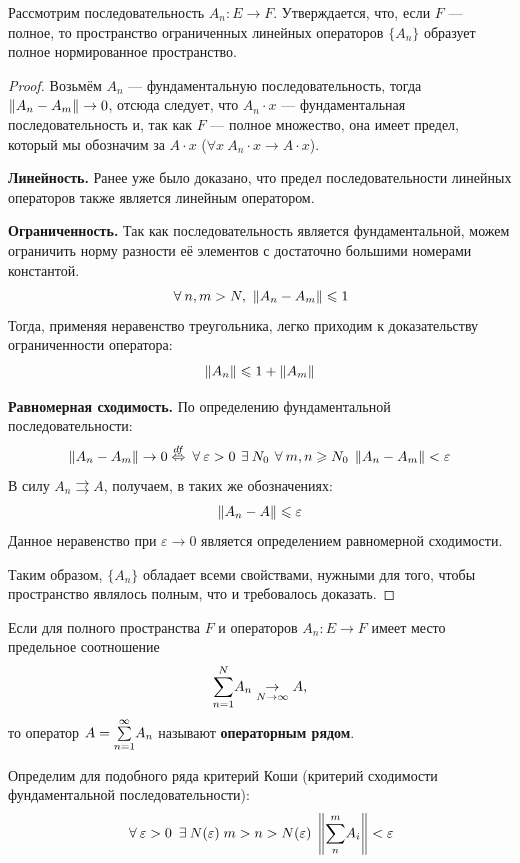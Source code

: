 \documentclass[12pt]{article}
\begin{document}
		\begin{state}
			Рассмотрим последовательность $A_n : E \rightarrow F$. Утверждается, что, если $F$ --- полное, то пространство 
			ограниченных линейных операторов $\{A_n\}$ образует полное нормированное пространство.
		\end{state}
		\begin{proof}
			Возьмём $A_n$ --- фундаментальную последовательность, тогда $\left\| A_n - A_m \right\| \rightarrow 0$, отсюда следует, что 
			$A_n \cdot x$ --- фундаментальная последовательность и, так как $F$ --- полное множество, она имеет предел, который
			мы обозначим за $A \cdot x$ ($\forall x \: A_n \cdot x \rightarrow A \cdot x$).
		
			\textbf{Линейность.} Ранее уже было доказано, что предел последовательности линейных операторов также является линейным
			оператором.
		
			\textbf{Ограниченность.} Так как последовательность является фундаментальной, можем ограничить норму разности её элементов 
			с достаточно большими номерами константой.
			$$\forall n,m > N,\,\,\norm{A_n - A_m} \leq 1$$
			Тогда, применяя неравенство треугольника, легко приходим к доказательству ограниченности оператора:
			$$\left\| A_n \right\| \leqslant 1 + \left\| A_m \right\|$$
		
			\textbf{Равномерная сходимость.} По определению фундаментальной последовательности:
			$$
				\norm{A_n - A_m} \rightarrow 0 \overset{df}{\equals} 
				\forall \varepsilon > 0\, \exists N_0\, \forall m, n \geq N_0 \; \norm{A_n - A_m} < \varepsilon
			$$
			В силу $A_n \rightrightarrows A$, получаем, в таких же обозначениях:
			$$ \left\| A_n - A \right\| \leqslant \varepsilon $$
			Данное неравенство при $\varepsilon \rightarrow 0$ является определением равномерной сходимости.
		
			Таким образом, $\{A_n\}$ обладает всеми свойствами, нужными для того, чтобы пространство являлось полным, что и требовалось 
			доказать.
		\end{proof}
	
		\begin{defi}
			Если для полного пространства $F$ и операторов $A_n : E \rightarrow F$ имеет место предельное соотношение
			$$\underset{n=1}{\overset{N}{\sum}} A_n \underset{N \rightarrow \infty}{\rightarrow} A,$$
			то оператор $A = \underset{n=1}{\overset{\infty}{\sum}} A_n$ называют \textbf{операторным рядом}.
		\end{defi}
	
		Определим для подобного ряда критерий Коши (критерий сходимости фундаментальной последовательности):
		$$\forall \varepsilon > 0 \; \exists N(\varepsilon) \; m > n > N(\varepsilon) \; \norm{ \Sum{n}{m} A_i } < \varepsilon$$
	
\end{document}
